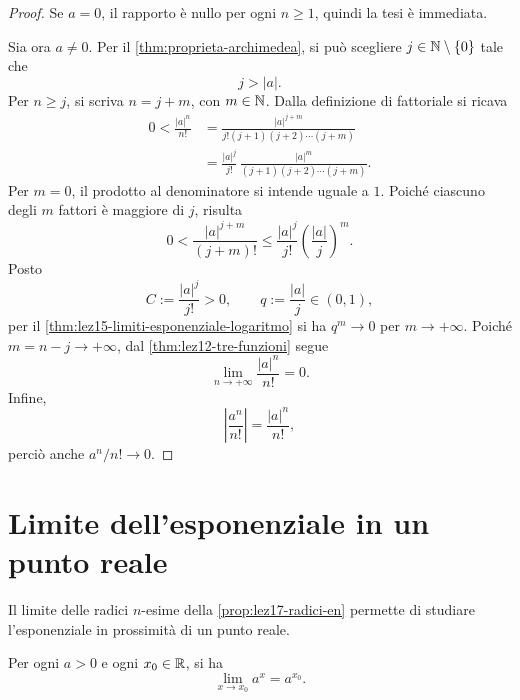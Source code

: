 \begin{proof}
Se \(a=0\), il rapporto è nullo per ogni \(n\ge1\),
quindi la tesi è immediata.

Sia ora \(a\ne0\). Per il
\cref{thm:proprieta-archimedea}, si può scegliere
\(j\in\mathbb{N}\setminus\{0\}\) tale che
\[
  j>|a|.
\]
Per \(n\ge j\), si scriva \(n=j+m\), con \(m\in\mathbb{N}\).
Dalla definizione di fattoriale si ricava
\[
\begin{aligned}
  0<\frac{|a|^n}{n!}
  &=\frac{|a|^{j+m}}{j!(j+1)(j+2)\cdots(j+m)}\\
  &=\frac{|a|^j}{j!}\,
    \frac{|a|^m}{(j+1)(j+2)\cdots(j+m)}.
\end{aligned}
\]
Per \(m=0\), il prodotto al denominatore si intende
uguale a \(1\). Poiché ciascuno degli \(m\) fattori è
maggiore di \(j\), risulta
\[
  0<\frac{|a|^{j+m}}{(j+m)!}
  \le\frac{|a|^j}{j!}
    \left(\frac{|a|}{j}\right)^m.
\]
Posto
\[
  C:=\frac{|a|^j}{j!}>0,
  \qquad q:=\frac{|a|}{j}\in(0,1),
\]
per il \cref{thm:lez15-limiti-esponenziale-logaritmo}
si ha \(q^m\to0\) per \(m\to+\infty\).
Poiché \(m=n-j\to+\infty\), dal
\cref{thm:lez12-tre-funzioni} segue
\[
  \lim_{n\to+\infty}\frac{|a|^n}{n!}=0.
\]
Infine,
\[
  \left|\frac{a^n}{n!}\right|
    =\frac{|a|^n}{n!},
\]
perciò anche \(a^n/n!\to0\).
\end{proof}

\section{Limite dell'esponenziale in un punto reale}
\label{sec:lez18-limite-esponenziale}

Il limite delle radici \(n\)-esime della
\cref{prop:lez17-radici-en} permette di studiare
l'esponenziale in prossimità di un punto reale.

\begin{theorem}
\label{thm:lez18-limite-esponenziale}
Per ogni \(a>0\) e ogni \(x_0\in\mathbb{R}\), si ha
\[
  \lim_{x\to x_0}a^x=a^{x_0}.
\]
\end{theorem}

